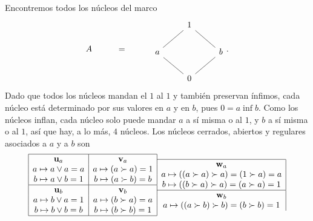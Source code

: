 \begin{exa}%
  Encontremos todos los núcleos del marco
  \[
    A\hspace{10mm} = \hspace{10mm}
    \begin{tikzcd}
      & 1 \\
      a \ar[ur,no head] && b\ar[ul,no head] \\
      & 0 \ar[ur,no head] \ar[ul,no head]
    \end{tikzcd}
  .\]
  Dado que todos los núcleos mandan el $1$ al $1$ y
  también preservan ínfimos, cada núcleo está determinado por
  sus valores en $a$ y en $b$, pues $0=a\inf b$.
  Como los núcleos inflan, cada núcleo solo puede mandar $a$ a sí
  misma o al $1$, y $b$ a sí misma o al $1$, así que hay, a lo
  más, $4$ núcleos.
  Los núcleos cerrados, abiertos y regulares
  asociados a $a$ y a $b$ son
  \[ 
      \begin{array}{|c|}
          \hline
          \mathbf u_{a} \\
          a\mapsto a\vee a = a \\
          b\mapsto a\vee b = 1 \\ \hline
          \mathbf u_{b} \\
          a\mapsto b\vee a = 1 \\
          b\mapsto b\vee b = b \\
          \hline
      \end{array}
      \begin{array}{c|}
          \hline
          \mathbf v_{a} \\
          a\mapsto (a\succ a) = 1 \\
          b\mapsto (a\succ b) = b \\ \hline
          \mathbf v_{b} \\
          a\mapsto (b\succ a) = a \\
          b\mapsto (b\succ b) = 1 \\
          \hline
      \end{array}
      \begin{array}{c|}
          \hline
          \mathbf w_{a} \\
          a\mapsto ((a\succ a)\succ a) = (1\succ a) = a \\
          b\mapsto ((b\succ a)\succ a) = (a\succ a) = 1 \\
          \hline
          \mathbf w_{b} \\
          a\mapsto ((a\succ b)\succ b) = (b\succ b) = 1 \\

\end{array}\]
\end{exa}
